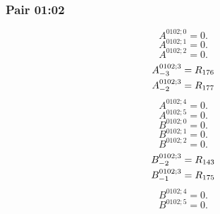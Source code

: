 \documentclass[11pt,a4paper]{article}
\begin{document}
\subsubsection{Pair 01:02}
\begin{equation}
A^{0102;0}=0.
\label{eq:cat-map-78}
\end{equation}
\begin{equation}
A^{0102;1}=0.
\label{eq:cat-map-79}
\end{equation}
\begin{equation}
A^{0102;2}=0.
\label{eq:cat-map-80}
\end{equation}
\begin{equation}
\shortstack[l]{$\displaystyle A^{0102;3}_{-3}=R_{176}$\\
$\displaystyle A^{0102;3}_{-2}=R_{177}$}
\label{eq:cat-map-81}
\end{equation}
\begin{equation}
A^{0102;4}=0.
\label{eq:cat-map-82}
\end{equation}
\begin{equation}
A^{0102;5}=0.
\label{eq:cat-map-83}
\end{equation}
\begin{equation}
B^{0102;0}=0.
\label{eq:cat-map-84}
\end{equation}
\begin{equation}
B^{0102;1}=0.
\label{eq:cat-map-85}
\end{equation}
\begin{equation}
B^{0102;2}=0.
\label{eq:cat-map-86}
\end{equation}
\begin{equation}
\shortstack[l]{$\displaystyle B^{0102;3}_{-2}=R_{143}$\\
$\displaystyle B^{0102;3}_{-1}=R_{175}$}
\label{eq:cat-map-87}
\end{equation}
\begin{equation}
B^{0102;4}=0.
\label{eq:cat-map-88}
\end{equation}
\begin{equation}
B^{0102;5}=0.
\label{eq:cat-map-89}
\end{equation}
\end{document}
